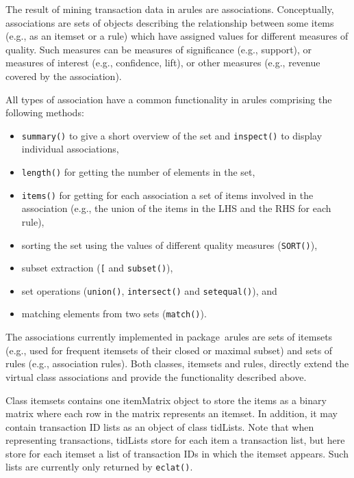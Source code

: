 \documentclass[10pt,a4paper]{article}
\newcommand{\strong}[1]{{\normalfont\fontseries{b}\selectfont #1}}
\newcommand{\class}[1]{\mbox{\textsf{#1}}}
\newcommand{\func}[1]{\mbox{\texttt{#1()}}}
\newcommand{\code}[1]{\mbox{\texttt{#1}}}
\newcommand{\pkg}[1]{\strong{#1}}
\begin{document}
The result of mining transaction data in \pkg{arules} are
\class{associations.}  Conceptually, associations are sets of objects
describing the relationship between some items (e.g., as an itemset or a
rule) which have assigned values for different measures of quality.
Such measures can be measures of significance (e.g., support), or
measures of interest (e.g., confidence, lift), or other measures (e.g.,
revenue covered by the association).

All types of association have a common functionality in \pkg{arules} comprising
the following methods:
\begin{itemize}
 \item \func{summary} to give a short overview of the set and
  \func{inspect} to display individual associations,
 \item \func{length} for getting the number of elements in the set,
 \item \func{items} for getting for each association a set of items
  involved in the association (e.g., the union of the items in the LHS
  and the RHS for each rule),
 \item sorting the set using the values of different quality measures
  (\func{SORT}),
 \item subset extraction (\code{[} and \func{subset}),
 \item set operations (\func{union}, \func{intersect} and
  \func{setequal}), and
 \item matching elements from two sets (\func{match}).
\end{itemize}

The associations currently implemented in package~\pkg{arules} are sets
of itemsets (e.g., used for frequent itemsets of their closed or maximal
subset) and sets of rules (e.g., association rules).  Both classes,
\class{itemsets} and \class{rules}, directly extend the virtual class
\class{associations} and provide the functionality described above.

Class \class{itemsets} contains one \class{itemMatrix} object to store
the items as a binary matrix where each row in the matrix represents an
itemset. In addition, it may contain transaction ID lists as an object
of class \class{tidLists}.  Note that when representing transactions,
\class{tidLists} store for each item a transaction list, but here store
for each itemset a list of transaction IDs in which the itemset appears.
Such lists are currently only returned by \func{eclat}.
\end{document}
